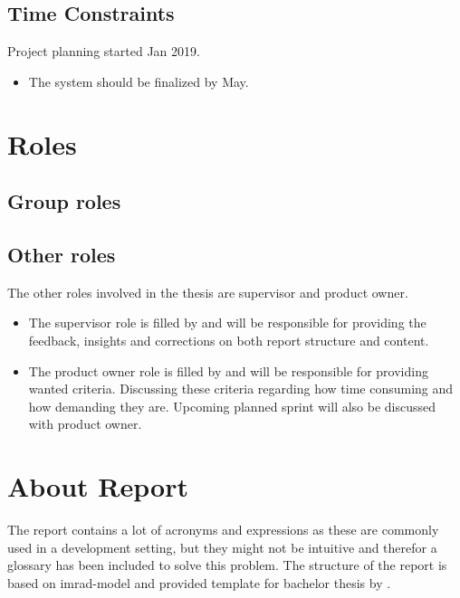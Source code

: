 \subsection{Time Constraints}
Project planning started  Jan 2019.

\begin{itemize}
    \item The system should be finalized by  May.
\end{itemize}

\section{Roles}
\subsection{Group roles}


\subsection{Other roles}
The other roles involved in the thesis are supervisor and product owner.
\begin{itemize}
    \item The supervisor role is filled by \supervisor{} and will be responsible for providing the feedback, insights and corrections on both report structure and content.
    \item The product owner role is filled by \productowner{} and will be responsible for providing wanted criteria. Discussing these criteria regarding how time consuming and how demanding they are. Upcoming planned sprint will also be discussed with product owner.
\end{itemize}


\section{About Report}
The report contains a lot of acronyms and expressions as these are commonly used in a development setting, but they might not be intuitive and therefor a glossary has been included to solve this problem. The structure of the report is based on \gls{imrad}-model and provided template for bachelor thesis by \NTNUgjovik{}.

